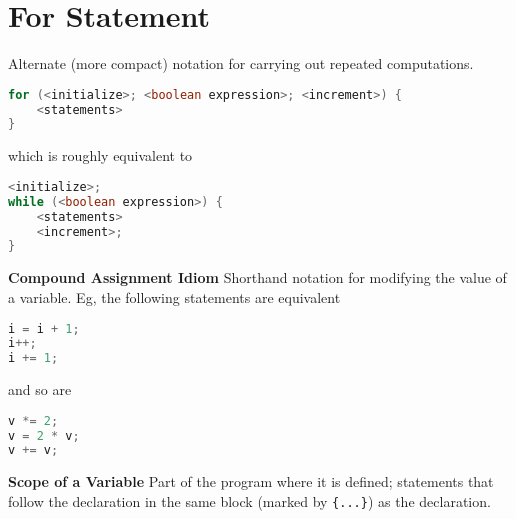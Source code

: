 \documentclass[8pt,a4paper,compress]{beamer}
\begin{document}
\section{For Statement}
\begin{frame}[fragile]
\pause
Alternate (more compact) notation for carrying out repeated computations.
\begin{lstlisting}[language=Java]
for (<initialize>; <boolean expression>; <increment>) {
    <statements>
}
\end{lstlisting}
which is roughly equivalent to 
\begin{lstlisting}[language=Java]
<initialize>;
while (<boolean expression>) {
    <statements>
    <increment>;
}
\end{lstlisting}

\pause
\smallskip

\textbf{Compound Assignment Idiom} Shorthand notation for modifying the value of a variable. Eg, the following statements are equivalent
\begin{lstlisting}[language=Java]
i = i + 1;
i++;
i += 1;
\end{lstlisting}
and so are
\begin{lstlisting}[language=Java]
v *= 2;
v = 2 * v;
v += v;
\end{lstlisting}

\pause
\smallskip

\textbf{Scope of a Variable} Part of the program where it is defined;  statements that follow the declaration in the same block (marked by \lstinline${...}$) as the declaration.

\end{frame}
\end{document}

